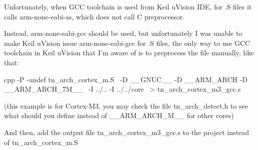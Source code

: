Unfortunately, when G\+C\+C toolchain is used from Keil u\+Vision I\+D\+E, for {\ttfamily .S} files it calls {\ttfamily arm-\/none-\/eabi-\/as}, which does not call C preprocessor.

Instead, {\ttfamily arm-\/none-\/eabi-\/gcc} should be used, but unfortunately I was unable to make Keil u\+Vision issue {\ttfamily arm-\/none-\/eabi-\/gcc} for {\ttfamily .S} files, the only way to use G\+C\+C toolchain in Keil u\+Vision that I'm aware of is to preprocess the file manually, like that\+: \begin{DoxyVerb}cpp -P -undef tn_arch_cortex_m.S                         \
      -D __GNUC__ -D __ARM_ARCH -D __ARM_ARCH_7M__       \
      -I ../.. -I ../../core                             \
      > tn_arch_cortex_m3_gcc.s
\end{DoxyVerb}


(this example is for Cortex-\/\+M3, you may check the file {\ttfamily tn\+\_\+arch\+\_\+detect.\+h} to see what should you define instead of {\ttfamily \+\_\+\+\_\+\+A\+R\+M\+\_\+\+A\+R\+C\+H\+\_\+M\+\_\+\+\_\+} for other cores)

And then, add the output file {\ttfamily tn\+\_\+arch\+\_\+cortex\+\_\+m3\+\_\+gcc.\+s} to the project instead of {\ttfamily tn\+\_\+arch\+\_\+cortex\+\_\+m.\+S} 